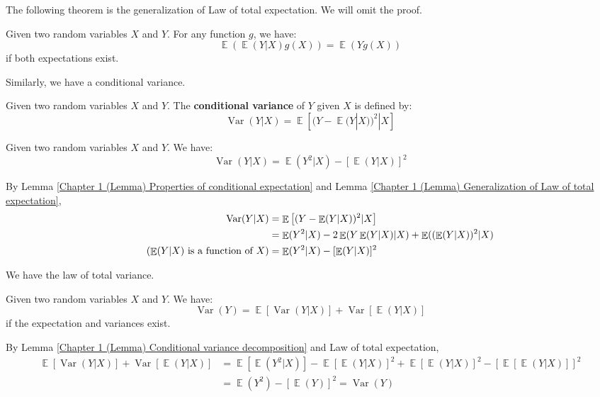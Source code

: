 \documentclass{huhtakm-template-book-v2}
\DeclareMathOperator{\E}{\mathbb{E}}
\DeclareMathOperator{\Var}{Var}
\begin{document}
The following theorem is the generalization of Law of total expectation. We will omit the proof.
\begin{lem}
	\label{Chapter 1 (Lemma) Generalization of Law of total expectation}
	Given two random variables $X$ and $Y$. For any function $g$, we have:
	\begin{equation*}
		\E(\E(Y|X)g(X))=\E(Yg(X))
	\end{equation*}
	if both expectations exist.
\end{lem}
Similarly, we have a conditional variance.
\begin{defn}
	Given two random variables $X$ and $Y$. The \textbf{conditional variance} of $Y$ given $X$ is defined by:
	\begin{equation*}
		\Var(Y|X)=\E\left[(Y-\E(Y|X))^{2}|X\right]
	\end{equation*}
\end{defn}
\begin{lem}
	\label{Chapter 1 (Lemma) Conditional variance decomposition}
	Given two random variables $X$ and $Y$. We have:
	\begin{equation*}
		\Var(Y|X)=\E(Y^{2}|X)-[\E(Y|X)]^{2}
	\end{equation*}
\end{lem}
\begin{proofing}
	By Lemma \ref{Chapter 1 (Lemma) Properties of conditional expectation} and Lemma \ref{Chapter 1 (Lemma) Generalization of Law of total expectation},
	\begin{align*}
		\Var(Y|X)&=\E\left[(Y-\E(Y|X))^{2}|X\right]\\
		&=\E(Y^{2}|X)-2\E(Y\E(Y|X)|X)+\E((\E(Y|X))^{2}|X)\\
		\tag{$\E(Y|X)$ is a function of $X$}
		&=\E(Y^{2}|X)-[\E(Y|X)]^{2}
	\end{align*}
\end{proofing}
We have the law of total variance.
\begin{thm}
	Given two random variables $X$ and $Y$. We have:
	\begin{equation*}
		\Var(Y)=\E[\Var(Y|X)]+\Var[\E(Y|X)]
	\end{equation*}
	if the expectation and variances exist.
\end{thm}
\begin{proofing}
	By Lemma \ref{Chapter 1 (Lemma) Conditional variance decomposition} and Law of total expectation,
	\begin{align*}
		\E[\Var(Y|X)]+\Var[\E(Y|X)]&=\E[\E(Y^{2}|X)]-\E[\E(Y|X)]^{2}+\E[\E(Y|X)]^{2}-\left[\E[\E(Y|X)]\right]^{2}\\
		&=\E(Y^{2})-[\E(Y)]^{2}=\Var(Y)
	\end{align*}
\end{proofing}
\end{document}
